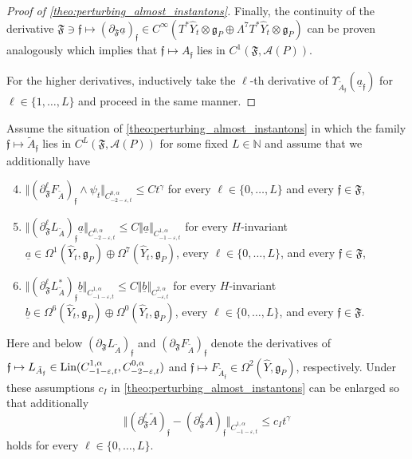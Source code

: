 \documentclass[11pt,a4paper]{scrartcl}
\newcommand{\VertWHt}[3]{\Vert_{C^{{#1},\alpha}_{{#2},t}{#3}}}
\numberwithin{equation}{section}
\theoremstyle{plain}
\theoremstyle{definition}
\theoremstyle{remark}
\begin{document}
\begin{proof}[Proof of \autoref{theo:perturbing_almost_instantons}]
Finally, the continuity of the derivative $\mathfrak{F} \ni \mathfrak{f} \mapsto (\partial_\mathfrak{F}\underline{a})_{\mathfrak{f}} \in C^{\infty}(T^*\hat{Y}_t \otimes \mathfrak{g}_P \oplus \Lambda^7 T^*\hat{Y}_t \otimes \mathfrak{g}_P) $ can be proven analogously which implies that $\mathfrak{f} \mapsto A_{\mathfrak{f}}$ lies in $C^1(\mathfrak{F},\mathcal{A}(P))$.

For the higher derivatives, inductively take the $\ell$-th derivative of $\Upsilon_{\tilde{A}_{\mathfrak{f}}}(\underline{a}_{\mathfrak{f}})$ for $\ell \in \{1,\dots,L\}$ and proceed in the same manner.
\end{proof}




\begin{proposition}\label{prop: derivative estimates on deformed family of instantons}
Assume the situation of \autoref{theo:perturbing_almost_instantons} in which the family $\mathfrak{f}\mapsto \tilde{A}_{\mathfrak{f}}$ lies in $C^L(\mathfrak{F},\mathcal{A}(P))$ for some fixed $L \in \mathbb{N}$ and assume that we additionally have 
\begin{enumerate}\setcounter{enumi}{3}
\item \label{bul:pregluing-error-of-derivatives} $\Vert (\partial_\mathfrak{F}^\ell F_{\tilde{A}})_{\mathfrak{f}} \wedge \psi_t \VertWHt{0}{-2-\varepsilon}{} \leq C t^{\gamma}$ for every $\ell\in \{0,\dots,L\}$ and every $\mathfrak{f}\in \mathfrak{F}$,
\item \label{bul: operator norm estimate on derivatives of L_A} $\Vert (\partial^\ell_{\mathfrak{F}}L_{\tilde{A}})_{\mathfrak{f}} \underline{a} \VertWHt{0}{-2-\varepsilon}{} \leq C \Vert  \underline{a} \VertWHt{1}{-1-\varepsilon}{}$  for every $H$-invariant $\underline{a}\in \Omega^1(\hat{Y}_t,\mathfrak{g}_P) \oplus \Omega^7(\hat{Y}_t,\mathfrak{g}_P)$, every $\ell\in \{0,\dots,L\}$, and every $\mathfrak{f}\in \mathfrak{F}$,
\item \label{bul: operator norm estimate on derivatives of L_A^*} $\Vert (\partial^\ell_{\mathfrak{F}}L_{\tilde{A}}^*)_{\mathfrak{f}} \underline{b} \VertWHt{1}{-1-\varepsilon}{} \leq C \Vert  \underline{b} \VertWHt{2}{-\varepsilon}{}$  for every $H$-invariant $\underline{b}\in \Omega^6(\hat{Y}_t,\mathfrak{g}_P) \oplus \Omega^0(\hat{Y}_t,\mathfrak{g}_P)$, every $\ell\in \{0,\dots,L\}$, and every $\mathfrak{f}\in \mathfrak{F}$.
\end{enumerate}
Here and below $(\partial_\mathfrak{F}L_{\tilde{A}})_{\mathfrak{f}}$ and $(\partial_{\mathfrak{F}}F_{\tilde{A}})_{\mathfrak{f}}$ denote the derivatives of $\mathfrak{f}\mapsto L_{\tilde{A}_\mathfrak{f}}\in \textup{Lin}(C^{1,\alpha}_{-1-\varepsilon,t},C^{0,\alpha}_{-2-\varepsilon,t})$ and $\mathfrak{f} \mapsto F_{\tilde{A}_\mathfrak{f}} \in \Omega^2(\hat{Y},\mathfrak{g}_P)$, respectively. Under these assumptions $c_I$ in \autoref{theo:perturbing_almost_instantons} can be enlarged so that additionally \[\Vert (\partial_{\mathfrak{F}}^\ell \tilde{A})_\mathfrak{f} - (\partial_{\mathfrak{F}}^\ell A)_\mathfrak{f} \VertWHt{1}{-1-\varepsilon}{} \leq c_I t^\gamma \] holds for every $\ell\in \{0,\dots,L\}$.
\end{proposition}
\end{document}
